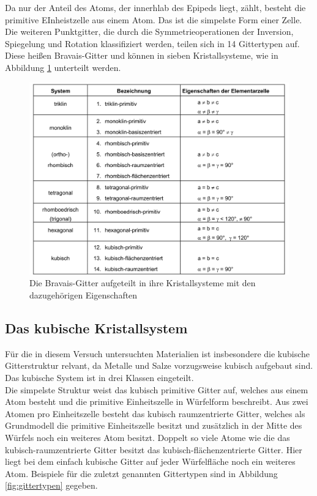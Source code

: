 Da nur der Anteil des Atoms, der innerhlab des Epipeds liegt, zählt, besteht die primitive EInheistzelle aus einem Atom.
Das ist die simpelste Form einer Zelle. 
Die weiteren Punktgitter, die durch die Symmetrieoperationen der Inversion, Spiegelung und Rotation klassifiziert werden, teilen sich in 14 Gittertypen auf. 
Diese heißen Bravais-Gitter und können in sieben Kristallsysteme, wie in Abbildung \ref{fig:System} unterteilt werden.
\begin{figure}
	\centering
	\includegraphics[width = \textwidth]{Abbildungen/System.png}
	\caption{Die Bravais-Gitter aufgeteilt in ihre Kristallsysteme mit den dazugehörigen Eigenschaften \cite{Anleitung}}
	\label{fig:System}
\end{figure} 
\subsection{Das kubische Kristallsystem}
Für die in diesem Versuch untersuchten Materialien ist insbesondere die kubische Gitterstruktur relvant, da Metalle und Salze vorzugsweise kubisch aufgebaut sind.
Das kubische System ist in drei Klassen eingeteilt.\\
Die simpelste Struktur weist das kubisch primitive Gitter auf, welches aus einem Atom besteht und die primitive Einheitszelle in Würfelform beschreibt.
Aus zwei Atomen pro Einheitszelle besteht das kubisch raumzentrierte Gitter, welches als Grundmodell die primitive Einheitszelle besitzt und zusätzlich in der Mitte des Würfels noch ein weiteres Atom besitzt.
Doppelt so viele Atome wie die das kubisch-raumzentrierte Gitter besitzt das kubisch-flächenzentrierte Gitter.
Hier liegt bei dem einfach kubische Gitter auf jeder Würfelfläche noch ein weiteres Atom.
Beispiele für die zuletzt genannten Gittertypen sind in Abbildung \ref{fig:gittertypen} gegeben.

